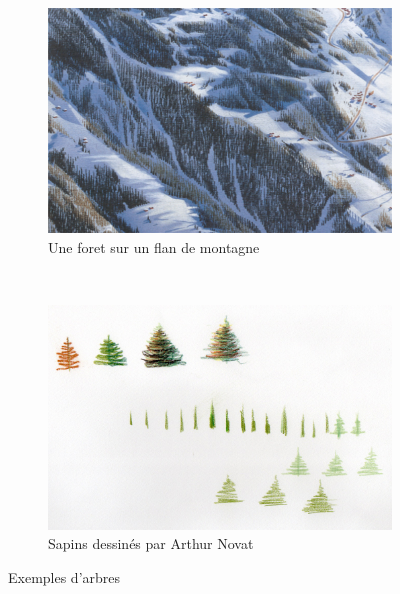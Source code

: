 \begin{figure}[h!]
\centering
 \begin{subfigure}[t]{0.47\textwidth}
 \centering
 \includegraphics[width=1.0\linewidth]{novat/arbres_zoom.png}
 \caption{\label{fig:foret} Une foret sur un flan de montagne}
 \end{subfigure}%
 ~
 \hspace{.05\textwidth}
 \begin{subfigure}[t]{0.47\textwidth}
 \centering
 \includegraphics[width=1.0\linewidth]{novat/novat_arbre.jpeg}
 \caption{\label{fig:sapinseuls} Sapins dessinés par Arthur Novat}
 \end{subfigure}
 \caption{\label{fig:ExArbres} Exemples d'arbres}
\end{figure}


